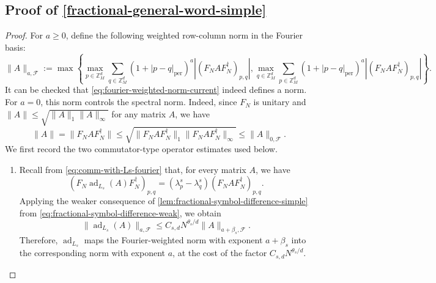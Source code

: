 \documentclass[10pt,reqno]{article}
\numberwithin{equation}{section}
\theoremstyle{plain}
\theoremstyle{definition}
\begin{document}
\subsection{Proof of \cref{fractional-general-word-simple}}\label{proof-of-fractional-general-word-simple}



\begin{proof}
For $a\geq 0$, define the following weighted row-column norm in the Fourier basis:
\begin{equation}\label{eq:fourier-weighted-norm-current}
\|A\|_{a,\mathcal F} := \max\left\{ \max_{p\in\mathbb Z_M^d} \sum_{q\in\mathbb Z_M^d} \left(1+|p-q|_{\operatorname{per}}\right)^a |(F_NAF_N^\dagger)_{p,q}|, \max_{q\in\mathbb Z_M^d} \sum_{p\in\mathbb Z_M^d} \left(1+|p-q|_{\operatorname{per}}\right)^a |(F_NAF_N^\dagger)_{p,q}| \right\}.
\end{equation}
It can be checked that \cref{eq:fourier-weighted-norm-current} indeed defines a norm. For $a=0$, this norm controls the spectral norm. Indeed, since $F_N$ is unitary and $\|A\|\leq \sqrt{\|A\|_1\|A\|_\infty}$ for any matrix $A$, we have
\begin{equation}\label{eq:fourier-weighted-controls-spectral-current}
\|A\| = \|F_N A F_N^\dagger\| \leq \sqrt{\|F_N A F_N^\dagger\|_1\|F_N A F_N^\dagger\|_\infty} \leq \|A\|_{0,\mathcal F}.
\end{equation}
We first record the two commutator-type operator estimates used below.
\begin{enumerate}
\item Recall from \cref{eq:comm-with-Ls-fourier} that, for every matrix $A$, we have
\begin{equation}\label{eq:Ls-commutator-weighted-current}
(F_N\operatorname{ad}_{L_s}(A)F_N^\dagger )_{p,q} = (\lambda_p^s-\lambda_q^s)(F_NAF_N^\dagger)_{p,q}.
\end{equation}
Applying the weaker consequence of  \cref{lem:fractional-symbol-difference-simple} from \cref{eq:fractional-symbol-difference-weak}, we obtain
\begin{equation}\label{eq:Ls-weighted-bound-current}
\|\operatorname{ad}_{L_s}(A)\|_{a,\mathcal F} \leq C_{s,d}N^{\theta_s/d} \|A\|_{a+\beta_s,\mathcal F}.
\end{equation}
Therefore, $\operatorname{ad}_{L_s}$ maps the Fourier-weighted norm with exponent $a+\beta_s$ into the corresponding norm with exponent $a$, at the cost of the factor $C_{s,d}N^{\theta_s/d}$.


\end{enumerate}
\end{proof}
\end{document}
